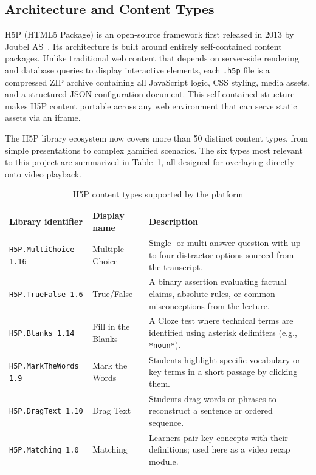 \subsection{Architecture and Content Types}

H5P (HTML5 Package) is an open-source framework first released in 2013 by Joubel AS~\cite{h5p2023}. Its architecture is built around entirely self-contained content packages. Unlike traditional web content that depends on server-side rendering and database queries to display interactive elements, each \texttt{.h5p} file is a compressed ZIP archive containing all JavaScript logic, CSS styling, media assets, and a structured JSON configuration document. This self-contained structure makes H5P content portable across any web environment that can serve static assets via an iframe.

The H5P library ecosystem now covers more than 50 distinct content types, from simple presentations to complex gamified scenarios. The six types most relevant to this project are summarized in Table~\ref{tab:h5p_types}, all designed for overlaying directly onto video playback.

\begin{table}[H]
  \centering
  \small
  \begin{tabularx}{\linewidth}{
    >{\raggedright\arraybackslash}p{3.5cm}
    >{\raggedright\arraybackslash}p{2.2cm}
    X
  }
    \toprule
    \textbf{Library identifier} & \textbf{Display name} & \textbf{Description} \\
    \midrule
    \texttt{H5P.MultiChoice 1.16} & Multiple Choice & Single- or multi-answer question with up to four distractor options sourced from the transcript. \\
    \addlinespace
    \texttt{H5P.TrueFalse 1.6} & True/False & A binary assertion evaluating factual claims, absolute rules, or common misconceptions from the lecture. \\
    \addlinespace
    \texttt{H5P.Blanks 1.14} & Fill in the Blanks & A Cloze test where technical terms are identified using asterisk delimiters (e.g., \texttt{*noun*}). \\
    \addlinespace
    \texttt{H5P.MarkTheWords 1.9} & Mark the Words & Students highlight specific vocabulary or key terms in a short passage by clicking them. \\
    \addlinespace
    \texttt{H5P.DragText 1.10} & Drag Text & Students drag words or phrases to reconstruct a sentence or ordered sequence. \\
    \addlinespace
    \texttt{H5P.Matching 1.0} & Matching & Learners pair key concepts with their definitions; used here as a video recap module. \\
    \bottomrule
  \end{tabularx}
  \caption{H5P content types supported by the platform}
  \label{tab:h5p_types}
\end{table}

